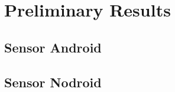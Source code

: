 \section{Preliminary Results}
\label{sec-results}

\subsection{Sensor Android}

\subsection{Sensor Nodroid}
